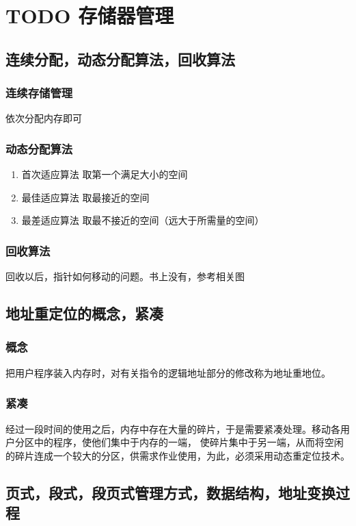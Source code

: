 \documentclass[11pt]{article}
\begin{document}
\section{{\bfseries\sffamily TODO} 存储器管理}
\label{sec-3}
\subsection{连续分配，动态分配算法，回收算法}
\label{sec-3-1}
\subsubsection{连续存储管理}
\label{sec-3-1-1}
依次分配内存即可
\subsubsection{动态分配算法}
\label{sec-3-1-2}
\begin{enumerate}
\item 首次适应算法
\label{sec-3-1-2-1}
取第一个满足大小的空间
\item 最佳适应算法
\label{sec-3-1-2-2}
取最接近的空间
\item 最差适应算法
\label{sec-3-1-2-3}
取最不接近的空间（远大于所需量的空间）
\end{enumerate}
\subsubsection{回收算法}
\label{sec-3-1-3}
回收以后，指针如何移动的问题。书上没有，参考相关图

\subsection{地址重定位的概念，紧凑}
\label{sec-3-2}
\subsubsection{概念}
\label{sec-3-2-1}
把用户程序装入内存时，对有关指令的逻辑地址部分的修改称为地址重地位。
\subsubsection{紧凑}
\label{sec-3-2-2}
    经过一段时间的使用之后，内存中存在大量的碎片，于是需要紧凑处理。移动各用户分区中的程序，使他们集中于内存的一端，
使碎片集中于另一端，从而将空闲的碎片连成一个较大的分区，供需求作业使用，为此，必须采用动态重定位技术。
\subsection{页式，段式，段页式管理方式，数据结构，地址变换过程}
\label{sec-3-3}
\end{document}
